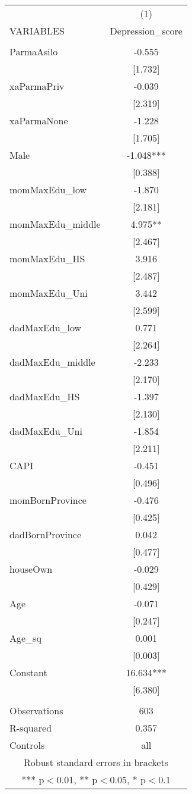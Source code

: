 \documentclass[]{article}
\begin{document}
\begin{tabular}{lc} \hline
 & (1) \\
VARIABLES & Depression\_score \\ \hline
 &  \\
ParmaAsilo & -0.555 \\
 & [1.732] \\
xaParmaPriv & -0.039 \\
 & [2.319] \\
xaParmaNone & -1.228 \\
 & [1.705] \\
Male & -1.048*** \\
 & [0.388] \\
momMaxEdu\_low & -1.870 \\
 & [2.181] \\
momMaxEdu\_middle & 4.975** \\
 & [2.467] \\
momMaxEdu\_HS & 3.916 \\
 & [2.487] \\
momMaxEdu\_Uni & 3.442 \\
 & [2.599] \\
dadMaxEdu\_low & 0.771 \\
 & [2.264] \\
dadMaxEdu\_middle & -2.233 \\
 & [2.170] \\
dadMaxEdu\_HS & -1.397 \\
 & [2.130] \\
dadMaxEdu\_Uni & -1.854 \\
 & [2.211] \\
CAPI & -0.451 \\
 & [0.496] \\
momBornProvince & -0.476 \\
 & [0.425] \\
dadBornProvince & 0.042 \\
 & [0.477] \\
houseOwn & -0.029 \\
 & [0.429] \\
Age & -0.071 \\
 & [0.247] \\
Age\_sq & 0.001 \\
 & [0.003] \\
Constant & 16.634*** \\
 & [6.380] \\
 &  \\
Observations & 603 \\
R-squared & 0.357 \\
 Controls & all \\ \hline
\multicolumn{2}{c}{ Robust standard errors in brackets} \\
\multicolumn{2}{c}{ *** p$<$0.01, ** p$<$0.05, * p$<$0.1} \\
\end{tabular}
\end{document}

